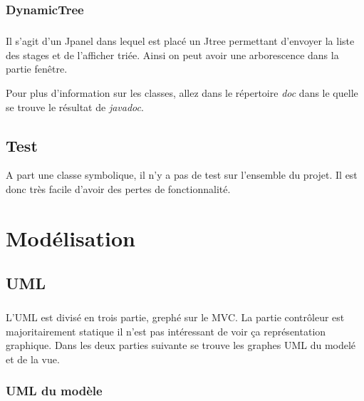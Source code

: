 \documentclass[a4paper,10pt]{report}
\begin{document}
		\subsection{DynamicTree}

			\paragraph*{}
			Il s'agit d'un Jpanel dans lequel est placé un Jtree permettant d'envoyer la liste des stages et de l'afficher triée.
			Ainsi on peut avoir une arborescence dans la partie fenêtre.

		Pour plus d'information sur les classes, allez dans le répertoire \textit{doc} dans le quelle se trouve le résultat de \textit{javadoc}.

	\section{Test}

		 A part une classe symbolique, il n'y a pas de test sur l’ensemble du projet. Il est donc très facile d'avoir des pertes de fonctionnalité.

\chapter{Modélisation}

	\section{UML}

		\paragraph*{}
		L'UML est divisé en trois partie, grephé sur le MVC. La partie contrôleur est majoritairement statique il n'est pas intéressant de voir ça représentation graphique. Dans les deux parties suivante se trouve les graphes UML du modelé et de la vue.

		\subsection{UML du modèle}
\end{document}
